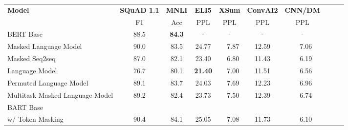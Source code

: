 \documentclass{article} %
\begin{document}
\begin{table}[ht]
\begin{center}
\begin{tabular}{lccccccccc}
\toprule
\textbf{Model} & \textbf{SQuAD 1.1}     & \textbf{MNLI}  & \textbf{ELI5} & \textbf{XSum} & \textbf{ConvAI2}  & \textbf{CNN/DM}  \\%
                                & F1                         & Acc          &    PPL        & PPL           &        PPL                 & PPL \\
\midrule
BERT Base \cite{bert}           &        88.5          & \textbf{84.3}    &      -        &       -       &            -         & -      \\
\midrule
Masked Language Model           &        90.0     &         83.5      &   24.77    &   ~~7.87     & 12.59                      &~~7.06\\ %
Masked Seq2seq                  &        87.0               &        82.1       &     23.40     &~~6.80         & 11.43                     & ~~6.19\\ %
Language Model                  &        76.7              &        80.1       &\textbf{21.40} &~~7.00         & 11.51    &                  ~~6.56\\ %
Permuted Language Model         &        89.1                &      83.7       &     24.03     &     ~~7.69   & 12.23                      &~~6.96\\ %
Multitask Masked Language Model &        89.2              &        82.4       &      23.73   &     ~~7.50    &   12.39                   &~~6.74\\ %
\midrule
BART Base             &   \\
w/ Token Masking                 &      90.4                &      84.1        &     25.05     &~~7.08          & 11.73                 &~~6.10\\ %

\end{tabular}
\end{center}
\end{table}
\end{document}
